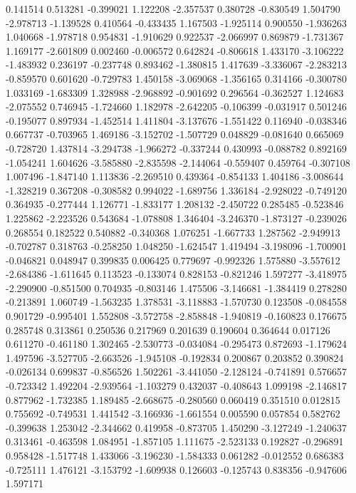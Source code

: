 0.141514
0.513281
-0.399021
1.122208
-2.357537
0.380728
-0.830549
1.504790
-2.978713
-1.139528
0.410564
-0.433435
1.167503
-1.925114
0.900550
-1.936263
1.040668
-1.978718
0.954831
-1.910629
0.922537
-2.066997
0.869879
-1.731367
1.169177
-2.601809
0.002460
-0.006572
0.642824
-0.806618
1.433170
-3.106222
-1.483932
0.236197
-0.237748
0.893462
-1.380815
1.417639
-3.336067
-2.283213
-0.859570
0.601620
-0.729783
1.450158
-3.069068
-1.356165
0.314166
-0.300780
1.033169
-1.683309
1.328988
-2.968892
-0.901692
0.296564
-0.362527
1.124683
-2.075552
0.746945
-1.724660
1.182978
-2.642205
-0.106399
-0.031917
0.501246
-0.195077
0.897934
-1.452514
1.411804
-3.137676
-1.551422
0.116940
-0.038346
0.667737
-0.703965
1.469186
-3.152702
-1.507729
0.048829
-0.081640
0.665069
-0.728720
1.437814
-3.294738
-1.966272
-0.337244
0.430993
-0.088782
0.892169
-1.054241
1.604626
-3.585880
-2.835598
-2.144064
-0.559407
0.459764
-0.307108
1.007496
-1.847140
1.113836
-2.269510
0.439364
-0.854133
1.404186
-3.008644
-1.328219
0.367208
-0.308582
0.994022
-1.689756
1.336184
-2.928022
-0.749120
0.364935
-0.277444
1.126771
-1.833177
1.208132
-2.450722
0.285485
-0.523846
1.225862
-2.223526
0.543684
-1.078808
1.346404
-3.246370
-1.873127
-0.239026
0.268554
0.182522
0.540882
-0.340368
1.076251
-1.667733
1.287562
-2.949913
-0.702787
0.318763
-0.258250
1.048250
-1.624547
1.419494
-3.198096
-1.700901
-0.046821
0.048947
0.399835
0.006425
0.779697
-0.992326
1.575880
-3.557612
-2.684386
-1.611645
0.113523
-0.133074
0.828153
-0.821246
1.597277
-3.418975
-2.290900
-0.851500
0.704935
-0.803146
1.475506
-3.146681
-1.384419
0.278280
-0.213891
1.060749
-1.563235
1.378531
-3.118883
-1.570730
0.123508
-0.084558
0.901729
-0.995401
1.552808
-3.572758
-2.858848
-1.940819
-0.160823
0.176675
0.285748
0.313861
0.250536
0.217969
0.201639
0.190604
0.364644
0.017126
0.611270
-0.461180
1.302465
-2.530773
-0.034084
-0.295473
0.872693
-1.179624
1.497596
-3.527705
-2.663526
-1.945108
-0.192834
0.200867
0.203852
0.390824
-0.026134
0.699837
-0.856526
1.502261
-3.441050
-2.128124
-0.741891
0.576657
-0.723342
1.492204
-2.939564
-1.103279
0.432037
-0.408643
1.099198
-2.146817
0.877962
-1.732385
1.189485
-2.668675
-0.280560
0.060419
0.351510
0.012815
0.755692
-0.749531
1.441542
-3.166936
-1.661554
0.005590
0.057854
0.582762
-0.399638
1.253042
-2.344662
0.419958
-0.873705
1.450290
-3.127249
-1.240637
0.313461
-0.463598
1.084951
-1.857105
1.111675
-2.523133
0.192827
-0.296891
0.958428
-1.517748
1.433066
-3.196230
-1.584333
0.061282
-0.012552
0.686383
-0.725111
1.476121
-3.153792
-1.609938
0.126603
-0.125743
0.838356
-0.947606
1.597171
